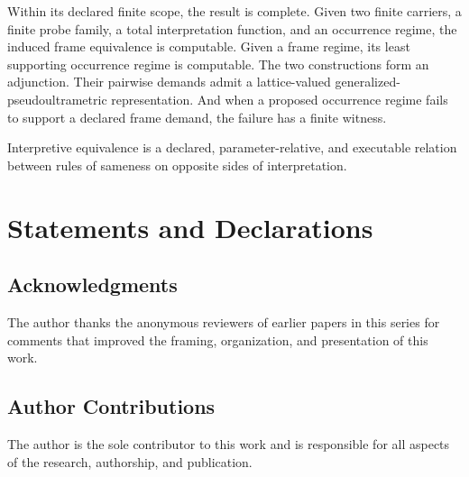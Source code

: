\documentclass[11pt]{article}
\theoremstyle{plain}
\theoremstyle{definition}
\theoremstyle{remark}
\begin{document}
Within its declared finite scope, the result is complete.
Given two finite carriers, a finite probe family,
a total interpretation function, and an occurrence regime,
the induced frame equivalence is computable.
Given a frame regime, its least supporting occurrence regime is computable.
The two constructions form an adjunction.
Their pairwise demands admit a lattice-valued
generalized-pseudoultrametric representation.
And when a proposed occurrence regime
fails to support a declared frame demand,
the failure has a finite witness.

Interpretive equivalence is a declared, parameter-relative, and executable relation
between rules of sameness on opposite sides of interpretation.

\section*{Statements and Declarations}

\subsection*{Acknowledgments}
The author thanks the anonymous reviewers of earlier papers in this series
for comments that improved the framing, organization, and presentation of this work.

\subsection*{Author Contributions}
The author is the sole contributor to this work
and is responsible for all aspects of the research, authorship, and publication.

\end{document}
